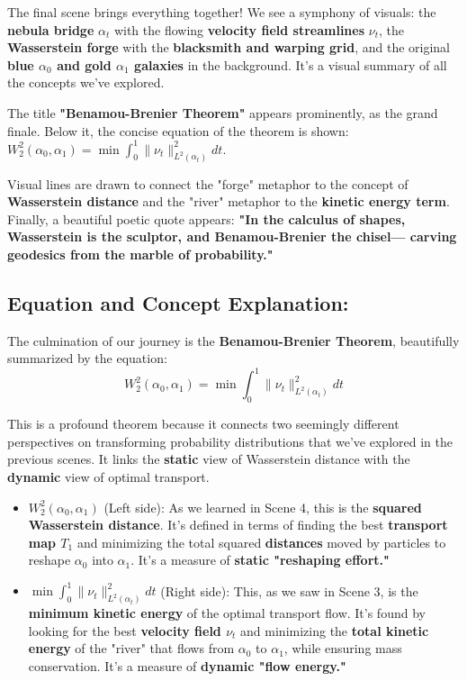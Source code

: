 \documentclass{article}
\begin{document}
The final scene brings everything together! We see a symphony of visuals: the \textbf{nebula bridge} \( \alpha_t \) with the flowing \textbf{velocity field streamlines} \( \nu_t \), the \textbf{Wasserstein forge} with the \textbf{blacksmith and warping grid}, and the original \textbf{blue \( \alpha_0 \) and gold \( \alpha_1 \) galaxies} in the background.  It's a visual summary of all the concepts we've explored.

The title \textbf{"Benamou-Brenier Theorem"} appears prominently, as the grand finale. Below it, the concise equation of the theorem is shown: \( W_2^2(\alpha_0, \alpha_1) = \min \int_0^1 \|\nu_t\|_{L^2(\alpha_t)}^2 dt \).

Visual lines are drawn to connect the "forge" metaphor to the concept of \textbf{Wasserstein distance} and the "river" metaphor to the \textbf{kinetic energy term}.  Finally, a beautiful poetic quote appears: \textbf{"In the calculus of shapes, Wasserstein is the sculptor, and Benamou-Brenier the chisel--- carving geodesics from the marble of probability."}

\subsection*{Equation and Concept Explanation:}

The culmination of our journey is the \textbf{Benamou-Brenier Theorem}, beautifully summarized by the equation:
\[
W_2^2(\alpha_0, \alpha_1) = \min \int_0^1 \|\nu_t\|_{L^2(\alpha_t)}^2 dt
\]

This is a profound theorem because it connects two seemingly different perspectives on transforming probability distributions that we've explored in the previous scenes.  It links the \textbf{static} view of Wasserstein distance with the \textbf{dynamic} view of optimal transport.

\begin{itemize}
    \item \textbf{\( W_2^2(\alpha_0, \alpha_1) \)} (Left side):  As we learned in Scene 4, this is the \textbf{squared Wasserstein distance}. It's defined in terms of finding the best \textbf{transport map \( T_1 \)} and minimizing the total squared \textbf{distances} moved by particles to reshape \( \alpha_0 \) into \( \alpha_1 \). It's a measure of \textbf{static "reshaping effort."}
    \item \textbf{\( \min \int_0^1 \|\nu_t\|_{L^2(\alpha_t)}^2 dt \)} (Right side):  This, as we saw in Scene 3, is the \textbf{minimum kinetic energy} of the optimal transport flow.  It's found by looking for the best \textbf{velocity field \( \nu_t \)} and minimizing the \textbf{total kinetic energy} of the "river" that flows from \( \alpha_0 \) to \( \alpha_1 \), while ensuring mass conservation. It's a measure of \textbf{dynamic "flow energy."}
\end{itemize}
\end{document}
